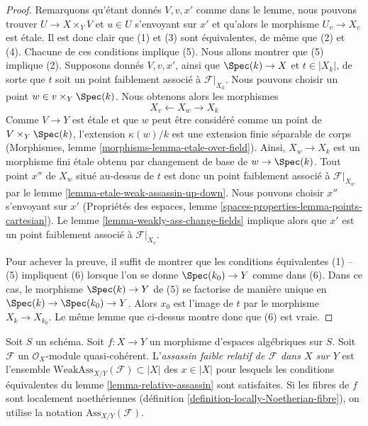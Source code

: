\begin{proof}
Remarquons qu'étant donnés $V, v, x'$ comme dans le lemme, nous pouvons trouver
$U \to X \times_Y V$ et $u \in U$ s'envoyant sur $x'$
et qu'alors le morphisme $U_v \to X_v$ est \'etale.
Il est donc clair que (1) et (3) sont équivalentes,
de même que (2) et (4). Chacune de ces conditions implique (5).
Nous allons montrer que (5) implique (2).
Supposons donnés $V, v, x'$, ainsi que $\Spec(k) \to X$ et $t \in |X_k|$,
de sorte que $t$ soit un point faiblement
associé à $\mathcal{F}|_{X_k}$.
Nous pouvons choisir un point $w \in v \times_Y \Spec(k)$.
Nous obtenons alors les morphismes
$$
X_v \longleftarrow X_w \longrightarrow X_k
$$
Comme $V \to Y$ est \'etale et que $w$ peut être considéré comme un point de
$V \times_Y \Spec(k)$, l'extension $\kappa(w)/k$
est une extension finie séparable de corps
(Morphismes, lemme \ref{morphisms-lemma-etale-over-field}).
Ainsi, $X_w \to X_k$ est un morphisme fini \'etale obtenu par changement de base de
$w \to \Spec(k)$. Tout point $x''$ de $X_w$ situé au-dessus de $t$
est donc un point faiblement associé à $\mathcal{F}|_{X_w}$ par le
lemme \ref{lemma-etale-weak-assassin-up-down}.
Nous pouvons choisir $x''$ s'envoyant sur $x'$
(Propriétés des espaces, lemme \ref{spaces-properties-lemma-points-cartesian}).
Le lemme \ref{lemma-weakly-ass-change-fields}
implique alors que $x'$ est un point faiblement associé
à $\mathcal{F}|_{X_v}$.

\medskip\noindent
Pour achever la preuve, il suffit de montrer que les
conditions équivalentes (1) -- (5) impliquent (6) lorsque l'on se donne
$\Spec(k_0) \to Y$ comme dans (6). Dans ce cas, le morphisme
$\Spec(k) \to Y$ de (5) se factorise de manière unique en $\Spec(k) \to \Spec(k_0) \to Y$.
Alors $x_0$ est l'image de $t$ par le morphisme $X_k \to X_{k_0}$.
Le même lemme que ci-dessus montre donc que (6) est vraie.
\end{proof}

\begin{definition}
\label{definition-relative-weak-assassin}
Soit $S$ un schéma. Soit $f : X \to Y$ un morphisme d'espaces algébriques
sur $S$. Soit $\mathcal{F}$ un $\mathcal{O}_X$-module quasi-cohérent.
L'{\it assassin faible relatif de $\mathcal{F}$ dans $X$ sur $Y$}
est l'ensemble $\text{WeakAss}_{X/Y}(\mathcal{F}) \subset |X|$
des $x \in |X|$ pour lesquels les conditions équivalentes du
lemme \ref{lemma-relative-assassin} sont satisfaites.
Si les fibres de $f$ sont localement noethériennes
(définition \ref{definition-locally-Noetherian-fibre}),
on utilise la notation $\text{Ass}_{X/Y}(\mathcal{F})$.
\end{definition}

